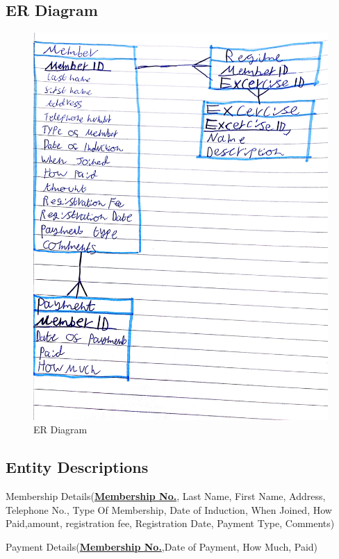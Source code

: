 \subsection{ER Diagram}

\begin{figure}[H]
    \includegraphics[width=\textwidth]{-ERDiagram.jpg}
    \caption{ER Diagram} \label{fig: ER Diagram}
\end{figure}


\subsection{Entity Descriptions}

Membership Details(\textbf{\underline{Membership No.}}, Last Name, First Name, Address, Telephone No., Type Of Membership, Date of Induction, When Joined, How Paid,amount, registration fee, Registration Date, Payment Type, Comments)

Payment Details(\textbf{\underline{Membership No.}},Date of Payment, How Much, Paid)

